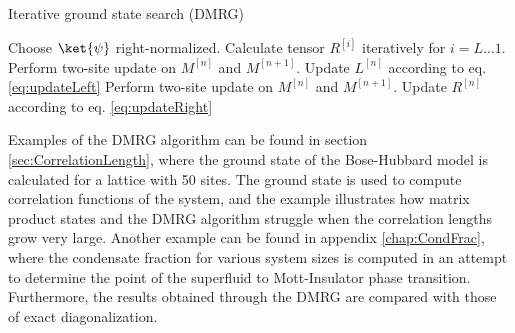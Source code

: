 \begin{algorithm}
\begin{algorithmic}
\caption{Iterative ground state search (DMRG)}
\State Choose $\ket{\psi}$ right-normalized.
\State Calculate tensor $R^{[i]}$ iteratively for $i = L \ldots 1$.
	 
		\State Perform two-site update on $M^{[n]}$ and $M^{[n+1]}$.
		\State Update $L^{[n]}$ according to eq. \eqref{eq:updateLeft}
	\EndFor
	 
		\State Perform two-site update on $M^{[n]}$ and $M^{[n+1]}$.
		\State Update $R^{[n]}$ according to eq. \eqref{eq:updateRight}
	\EndFor
\EndWhile
\end{algorithmic}
\end{algorithm}

Examples of the DMRG algorithm can be found in section \ref{sec:CorrelationLength}, where the ground state of the Bose-Hubbard model is calculated for a lattice with 50 sites. The ground state is used to compute correlation functions of the system, and the example illustrates how matrix product states and the DMRG algorithm struggle when the correlation lengths grow very large. Another example can be found in appendix \ref{chap:CondFrac}, where the condensate fraction for various system sizes is computed in an attempt to determine the point of the superfluid to Mott-Insulator phase transition. Furthermore, the results obtained through the DMRG are compared with those of exact diagonalization.


